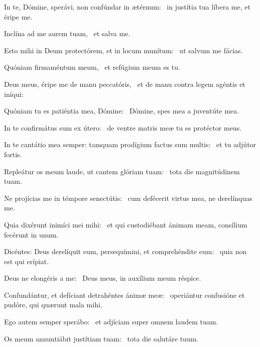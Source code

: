 \item In te, Dómine, sperávi, non confúndar in ætérnum:~\psstar{} in justítia tua líbera me, et éripe me.

\item Inclína ad me aurem tuam,~\psstar{} et salva me.

\item Esto mihi in Deum protectórem, et in locum munítum:~\psstar{} ut salvum me fácias.

\item Quóniam firmaméntum meum,~\psstar{} et refúgium meum es tu.

\item Deus meus, éripe me de manu peccatóris,~\psstar{} et de manu contra legem agéntis et iníqui:

\item Quóniam tu es patiéntia mea, Dómine:~\psstar{} Dómine, spes mea a juventúte mea.

\item In te confirmátus sum ex útero:~\psstar{} de ventre matris meæ tu es protéctor meus.

\item In te cantátio mea semper: tamquam prodígium factus sum multis:~\psstar{} et tu adjútor fortis.

\item Repleátur os meum laude, ut cantem glóriam tuam:~\psstar{} tota die magnitúdinem tuam.

\item Ne projícias me in témpore senectútis:~\psstar{} cum defécerit virtus mea, ne derelínquas me.

\item Quia dixérunt inimíci mei mihi:~\psstar{} et qui custodiébant ánimam meam, consílium fecérunt in unum.

\item Dicéntes: Deus derelíquit eum, persequímini, et comprehéndite eum:~\psstar{} quia non est qui erípiat.

\item Deus ne elongéris a me:~\psstar{} Deus meus, in auxílium meum réspice.

\item Confundántur, et defíciant detrahéntes ánimæ meæ:~\psstar{} operiántur confusióne et pudóre, qui quærunt mala mihi.

\item Ego autem semper sperábo:~\psstar{} et adjíciam super omnem laudem tuam.

\item Os meum annuntiábit justítiam tuam:~\psstar{} tota die salutáre tuum.

